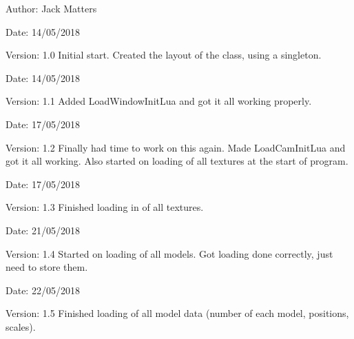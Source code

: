 \begin{Desc}
\item[Author:]Jack Matters\end{Desc}
\begin{Desc}
\item[Date:]14/05/2018 \end{Desc}
\begin{Desc}
\item[Version:]1.0 Initial start. Created the layout of the class, using a singleton.\end{Desc}
\begin{Desc}
\item[Date:]14/05/2018 \end{Desc}
\begin{Desc}
\item[Version:]1.1 Added LoadWindowInitLua and got it all working properly.\end{Desc}
\begin{Desc}
\item[Date:]17/05/2018 \end{Desc}
\begin{Desc}
\item[Version:]1.2 Finally had time to work on this again. Made LoadCamInitLua and got it all working. Also started on loading of all textures at the start of program.\end{Desc}
\begin{Desc}
\item[Date:]17/05/2018 \end{Desc}
\begin{Desc}
\item[Version:]1.3 Finished loading in of all textures.\end{Desc}
\begin{Desc}
\item[Date:]21/05/2018 \end{Desc}
\begin{Desc}
\item[Version:]1.4 Started on loading of all models. Got loading done correctly, just need to store them.\end{Desc}
\begin{Desc}
\item[Date:]22/05/2018 \end{Desc}
\begin{Desc}
\item[Version:]1.5 Finished loading of all model data (number of each model, positions, scales).\end{Desc}

